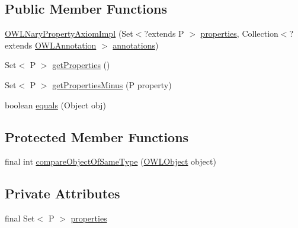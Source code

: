 \subsection*{Public Member Functions}
\begin{DoxyCompactItemize}
\item 
\hyperlink{classuk_1_1ac_1_1manchester_1_1cs_1_1owl_1_1owlapi_1_1_o_w_l_nary_property_axiom_impl_3_01_p_01ebb131bf5bfcb769e964dbdcf75a7ae4d_a97f1472c3aef11d6397af2c558d29b21}{O\-W\-L\-Nary\-Property\-Axiom\-Impl} (Set$<$?extends P $>$ \hyperlink{classuk_1_1ac_1_1manchester_1_1cs_1_1owl_1_1owlapi_1_1_o_w_l_nary_property_axiom_impl_3_01_p_01ebb131bf5bfcb769e964dbdcf75a7ae4d_aece5c1a7864847fdb2b0e187d293cd64}{properties}, Collection$<$?extends \hyperlink{interfaceorg_1_1semanticweb_1_1owlapi_1_1model_1_1_o_w_l_annotation}{O\-W\-L\-Annotation} $>$ \hyperlink{classuk_1_1ac_1_1manchester_1_1cs_1_1owl_1_1owlapi_1_1_o_w_l_axiom_impl_af6fbf6188f7bdcdc6bef5766feed695e}{annotations})
\item 
Set$<$ P $>$ \hyperlink{classuk_1_1ac_1_1manchester_1_1cs_1_1owl_1_1owlapi_1_1_o_w_l_nary_property_axiom_impl_3_01_p_01ebb131bf5bfcb769e964dbdcf75a7ae4d_a1cde061a9f1ab8debc9a8fcfd28cf930}{get\-Properties} ()
\item 
Set$<$ P $>$ \hyperlink{classuk_1_1ac_1_1manchester_1_1cs_1_1owl_1_1owlapi_1_1_o_w_l_nary_property_axiom_impl_3_01_p_01ebb131bf5bfcb769e964dbdcf75a7ae4d_a22c84edcb2a8befa26037c7b26b19082}{get\-Properties\-Minus} (P property)
\item 
boolean \hyperlink{classuk_1_1ac_1_1manchester_1_1cs_1_1owl_1_1owlapi_1_1_o_w_l_nary_property_axiom_impl_3_01_p_01ebb131bf5bfcb769e964dbdcf75a7ae4d_abede7b6fb852e0d02a70c842174c34ca}{equals} (Object obj)
\end{DoxyCompactItemize}
\subsection*{Protected Member Functions}
\begin{DoxyCompactItemize}
\item 
final int \hyperlink{classuk_1_1ac_1_1manchester_1_1cs_1_1owl_1_1owlapi_1_1_o_w_l_nary_property_axiom_impl_3_01_p_01ebb131bf5bfcb769e964dbdcf75a7ae4d_a4ee6e9ae9b924be0af3efb9a3499a856}{compare\-Object\-Of\-Same\-Type} (\hyperlink{interfaceorg_1_1semanticweb_1_1owlapi_1_1model_1_1_o_w_l_object}{O\-W\-L\-Object} object)
\end{DoxyCompactItemize}
\subsection*{Private Attributes}
\begin{DoxyCompactItemize}
\item 
final Set$<$ P $>$ \hyperlink{classuk_1_1ac_1_1manchester_1_1cs_1_1owl_1_1owlapi_1_1_o_w_l_nary_property_axiom_impl_3_01_p_01ebb131bf5bfcb769e964dbdcf75a7ae4d_aece5c1a7864847fdb2b0e187d293cd64}{properties}
\end{DoxyCompactItemize}
